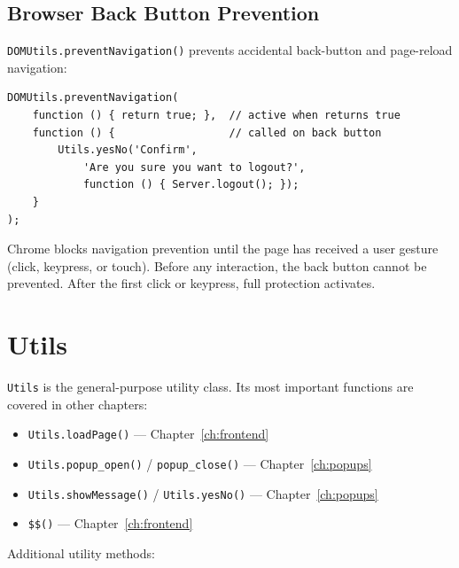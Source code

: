\subsection{Browser Back Button Prevention}

\texttt{DOMUtils.preventNavigation()} prevents accidental back-button and page-reload navigation:

\begin{lstlisting}[style=javascript]
DOMUtils.preventNavigation(
    function () { return true; },  // active when returns true
    function () {                  // called on back button
        Utils.yesNo('Confirm',
            'Are you sure you want to logout?',
            function () { Server.logout(); });
    }
);
\end{lstlisting}

\begin{notebox}
Chrome blocks navigation prevention until the page has received a user gesture (click, keypress, or touch).  Before any interaction, the back button cannot be prevented.  After the first click or keypress, full protection activates.
\end{notebox}

\section{Utils}
\label{sec:feu-utils}

\texttt{Utils} is the general-purpose utility class.  Its most important functions are covered in other chapters:

\begin{itemize}
  \item \texttt{Utils.loadPage()} --- Chapter~\ref{ch:frontend}
  \item \texttt{Utils.popup\_open()} / \texttt{popup\_close()} --- Chapter~\ref{ch:popups}
  \item \texttt{Utils.showMessage()} / \texttt{Utils.yesNo()} --- Chapter~\ref{ch:popups}
  \item \texttt{\$\$()} --- Chapter~\ref{ch:frontend}
\end{itemize}

\noindent
Additional utility methods:

